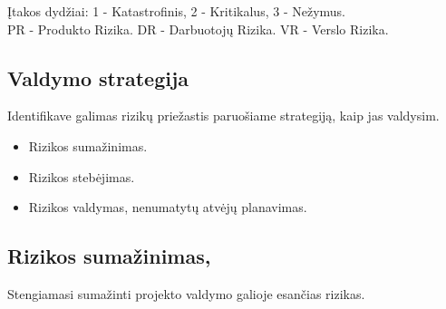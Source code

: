 \documentclass[a4paper,12pt]{article}
\begin{document}
\small

\k Itakos dydžiai: 
		1 - Katastrofinis,
		2 - Kritikalus,
		3 - Ne\v zymus.\\
		PR - Produkto Rizika. DR - Darbuotoj\k u Rizika. VR - Verslo Rizika.
	
\subsection{Valdymo strategija}
Identifikave galimas rizik\k u prie\v zastis paruo\v siame strategiją, kaip jas valdysim.
\begin{itemize}
  \item Rizikos suma\v zinimas.
  \item Rizikos steb\. ejimas.
  \item Rizikos valdymas, nenumatyt\k u atv\. ej\k u planavimas.
\end{itemize}

\subsection{Rizikos suma\v zinimas, }
Stengiamasi suma\v zinti projekto valdymo galioje esan\v cias rizikas.
\end{document}
